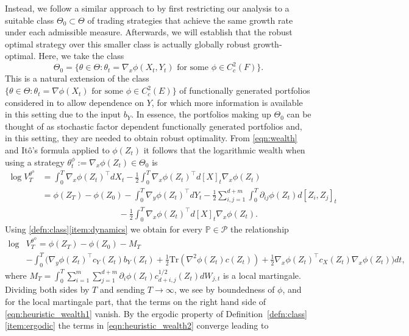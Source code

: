 \documentclass{article}
\theoremstyle{plain}
\theoremstyle{definition}
\renewcommand{\P}{\mathbb{P}}
\newcommand{\Pcal}{{\mathcal P}}
\numberwithin{lem}{section}
\begin{document}
Instead, we follow a similar approach to \cite{kardaras2021ergodic,itkin2025ergodic} by first restricting our analysis to a suitable class $\Theta_0 \subset \Theta$ of trading strategies that achieve the same growth rate under each admissible measure. Afterwards, we will establish that the robust  optimal strategy over this smaller class is actually globally robust growth-optimal. Here, we take the class
\[\Theta_0  =\{\theta \in \Theta: \theta_t = \nabla_x \phi(X_t,Y_t) \text{ for some } \phi \in C^2_c(F)\}. \]
This is a natural extension of the class
$\{\theta \in \Theta: \theta_t = \nabla \phi(X_t) \text{ for some } \phi \in C^2_c(E)\}$  of functionally generated portfolios considered in \cite{kardaras2021ergodic,itkin2025ergodic} to allow dependence on $Y$, for which more information is available in this setting due to the input $b_Y$. In essence, the portfolios making up $\Theta_0$ can be thought of as stochastic factor dependent functionally generated portfolios and, in this setting, they are needed to obtain robust optimality. From \eqref{eqn:wealth} and It\^o's formula applied to $\phi(Z_t)$ it follows that the logarithmic wealth when using a strategy $\theta^\phi_t := \nabla_x \phi(Z_t) \in \Theta_0$ is
\begin{align}
    \log V_T^{\theta^\phi} & =  \int_0^T \nabla_x \phi(Z_t)^\top dX_t - \frac{1}{2}\int_0^T \nabla_x \phi(Z_t)^\top d[X]_t \nabla_x \phi(Z_t) \\
    & = \phi(Z_T) - \phi(Z_0) - \int_0^T \nabla_y \phi(Z_t)^\top dY_t - \frac{1}{2}\sum_{i,j=1}^{d+m}\int_0^T  \partial_{ij} \phi(Z_t) d[Z_i,Z_j]_t \\
    & \qquad \qquad \qquad \qquad \quad - \frac{1}{2}\int_0^T \nabla_x \phi(Z_t)^\top d[X]_t \nabla_x \phi(Z_t).
\end{align}
Using \ref{defn:class}\ref{item:dynamics} we obtain for every $\P \in \Pcal$ the relationship
\begin{align} \label{eqn:heuristic_wealth1} \log & V_T^{\theta^\phi}  =  \phi(Z_T) - \phi(Z_0) - M_T  \\
& \label{eqn:heuristic_wealth2}  - \int_0^T \big(\nabla_y \phi(Z_t)^\top c_Y(Z_t) b_Y(Z_t) + \frac{1}{2}\mathrm{Tr}(\nabla^2 \phi (Z_t)c(Z_t)) + \frac{1}{2}\nabla_x \phi(Z_t)^\top c_X(Z_t)\nabla_x \phi(Z_t)\big)dt, 
\end{align}
where $M_T = \int_0^T \sum_{i=1}^m\sum_{j=1}^{d+m} \partial_i \phi(Z_t)c_{d+i,j}^{1/2}(Z_t)dW_{j,t}$ is a local martingale. Dividing both sides by $T$ and sending $T \to \infty$, we see by boundedness of $\phi$, and \cite[Lemma~1.3.2]{fernholz2002stochastic} for the local martingale part, that the terms on the right hand side of \eqref{eqn:heuristic_wealth1} vanish. By the ergodic property of Definition~\ref{defn:class}\ref{item:ergodic} the terms in \eqref{eqn:heuristic_wealth2} converge leading to
\end{document}
